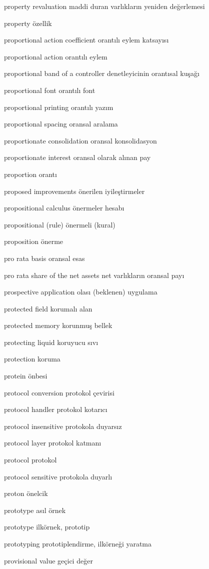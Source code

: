 \documentclass[12pt,fleqn]{article}\usepackage{../../common}
\begin{document}
property revaluation maddi duran varlıkların yeniden değerlemesi

property özellik

proportional action coefficient orantılı eylem katsayısı

proportional action orantılı eylem

proportional band of a controller denetleyicinin orantısal kuşağı

proportional font orantılı font

proportional printing orantılı yazım

proportional spacing oransal aralama

proportionate consolidation oransal konsolidasyon

proportionate interest oransal olarak alınan pay

proportion orantı

proposed improvements önerilen iyileştirmeler

propositional calculus önermeler hesabı

propositional (rule) önermeli (kural)

proposition önerme

pro rata basis oransal esas

pro rata share of the net assets net varlıkların oransal payı

prospective application olası (beklenen) uygulama

protected field korumalı alan

protected memory korunmuş bellek

protecting liquid koruyucu sıvı

protection koruma

protein önbesi

protocol conversion protokol çevirisi

protocol handler protokol kotarıcı

protocol insensitive protokola duyarsız

protocol layer protokol katmanı

protocol protokol

protocol sensitive protokola duyarlı

proton önelcik

prototype asıl örnek

prototype ilkörnek, prototip

prototyping prototiplendirme, ilkörneği yaratma

provisional value geçici değer
\end{document}
